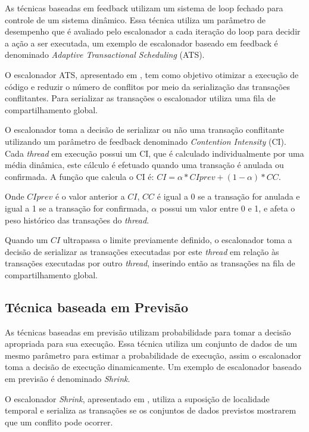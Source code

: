 \documentclass[ti]{texufpel} %
\begin{document}
As técnicas baseadas em feedback utilizam um sistema de loop fechado para controle de um sistema dinâmico. Essa técnica utiliza um parâmetro de desempenho que é avaliado pelo escalonador a cada iteração do loop para decidir a ação a ser executada, um exemplo de escalonador baseado em feedback é denominado \emph{Adaptive Transactional Scheduling} (ATS).

O escalonador ATS, apresentado em \cite{yoo08}, tem como objetivo otimizar a execução de código e reduzir o número de conflitos por meio da serialização das transações conflitantes. Para serializar as transações o escalonador utiliza uma fila de compartilhamento global.

O escalonador toma a decisão de serializar ou não uma transação conflitante utilizando um parâmetro de feedback denominado \emph{Contention Intensity} (CI). Cada \emph{thread} em execução possui um CI, que é calculado individualmente por uma média dinâmica, este cálculo é efetuado quando uma transação é anulada ou confirmada. A função que calcula o CI é: $CI = \alpha * CIprev + (1 - \alpha) * CC$.

Onde $CIprev$ é o valor anterior a $CI$, $CC$ é igual a 0 se a transação for anulada e igual a 1 se a transação for confirmada, $\alpha$ possui um valor entre 0 e 1, e afeta o peso histórico das transações do \emph{thread}.

Quando um $CI$ ultrapassa o limite previamente definido, o escalonador toma a decisão de serializar as transações executadas por este \emph{thread} em relação às transações executadas por outro \emph{thread}, inserindo então as transações na fila de compartilhamento global.


\subsection{Técnica baseada em Previsão}

As técnicas baseadas em previsão utilizam probabilidade para tomar a decisão apropriada para sua execução. Essa técnica utiliza um conjunto de dados de um mesmo parâmetro para estimar a probabilidade de execução, assim o escalonador toma a decisão de execução dinamicamente. Um exemplo de escalonador baseado em previsão é denominado \emph{Shrink}.

O escalonador \emph{Shrink}, apresentado em \cite{dragojevic09}, utiliza a suposição de localidade temporal e serializa as transações se os conjuntos de dados previstos mostrarem que um conflito pode ocorrer.
\end{document}
